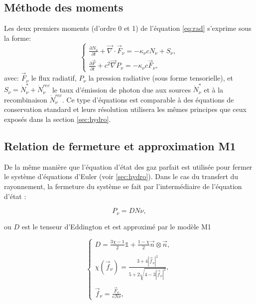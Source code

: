 \subsection{Méthode des moments}
Les deux premiers moments (d'ordre 0 et 1) de l'équation \ref{eq:rad} s'exprime sous la forme:
\begin{equation}
\begin{cases}
\frac{ \partial N_\nu }{ \partial t } + \vec{\nabla} \cdot \vec{F}_\nu = -\kappa_\nu c  N_\nu + S_\nu,\\
\frac{ \partial \vec{F} }{ \partial t } + c^2 \vec{\nabla} P_\nu = -\kappa_\nu c \vec{F}_\nu ,
\end{cases}
\label{eq:densite_energie}
\end{equation}
avec:
$\vec{F}_\nu$ le flux radiatif, 
$P_\nu $ la pression radiative (sous forme tensorielle),
et $S_\nu = \dot{N}_\nu^* + \dot{N}_\nu^{rec}$ le taux d’émission de photon due aux sources $\dot{N}_\nu^*$ et à la recombinaison $ \dot{N}_\nu^{rec}$.
Ce type d'équations est comparable à des équations de conservation standard et leurs résolution utilisera les mêmes principes que ceux exposés dans la section \ref{sec:hydro}.



\subsection{Relation de fermeture et approximation M1}

De la même manière que l'équation d'état des gaz parfait est utilisée pour fermer le système d'équations d'Euler (voir \ref{sec:hydro}).
Dans le cas du transfert du rayonnement, la fermeture du système se fait par l'intermédiaire de l’équation d’état :

\begin{equation}
 P_\nu = D N\nu ,
\label{eq:fermeture}
\end{equation}

ou $D$ est le tenseur d’Eddington et est approximé par le modèle M1 \citep{levermore_relating_1984}%

\begin{equation}
\begin{cases}

D = \frac{ 3\chi -1 }{2} \mathbb{1} + \frac{ 1 - \chi }{2} \vec{n} \otimes \vec{n} , \\
\\
\chi(\vec{f}_\nu) = \frac{ 3+4 |\vec{f}_\nu|^2 }{5+2\sqrt{4-3|\vec{f}_\nu|^2}} , \\
\\
\vec{f}_\nu = \frac{ \vec{F}_\nu }{c N\nu }  ,

\end{cases}
\label{eq:tenseur}
\end{equation}

